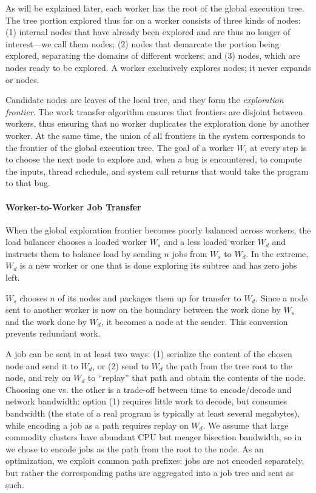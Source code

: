 As will be explained later, each worker has the root of the global execution tree.  The tree portion explored thus far on a worker consists of three kinds of nodes: (1) internal nodes that have already been explored and are thus no longer of interest---we call them {\em \dead} nodes; (2) {\em \fence} nodes that demarcate the portion being explored, separating the domains of different workers; and (3) {\em \candidate} nodes, which are nodes ready to be explored.  A worker exclusively explores \candidate nodes; it never expands \fence or \dead nodes.

Candidate nodes are leaves of the local tree, and they form the \emph{exploration frontier}.  The work transfer algorithm ensures that frontiers are disjoint between workers, thus ensuring that no worker duplicates the exploration done by another worker.  At the same time, the union of all frontiers in the system corresponds to the frontier of the global execution tree. The goal of a worker  $W_i$ at every step is to choose the next \candidate node to explore and, when a bug is encountered, to compute the inputs, thread schedule, and system call returns that would take the program to that bug.

\paragraph{Worker-to-Worker Job Transfer}
\label{sec:workTransfer}

\newcommand{\wsrc}{\ensuremath{W_s}\xspace}
\newcommand{\wdst}{\ensuremath{W_d}\xspace}

When the global exploration frontier becomes poorly balanced across workers, the load balancer chooses a loaded worker \wsrc and a less loaded worker \wdst  and instructs them to balance load by sending $n$ jobs from \wsrc to \wdst.  In the extreme, \wdst is a new worker or one that is done exploring its subtree and has zero jobs left.  

\wsrc chooses $n$ of its \candidate nodes and packages them up for transfer to \wdst.  Since a \candidate node sent to another worker is now on the boundary between the work done by \wsrc and the work done by \wdst, it becomes a \fence node at the sender.  This conversion prevents redundant work.

A job can be sent in at least two ways: (1) serialize the content of the chosen node and send it to \wdst, or (2) send to \wdst the path from the tree root to the node, and rely on \wdst to ``replay'' that path and obtain the contents of the node.  Choosing one vs. the other is a trade-off between time to encode/decode and network bandwidth: option (1) requires little work to decode, but consumes bandwidth (the state of a real program is typically at least several megabytes), while encoding a job as a path requires replay on \wdst.  We assume that large commodity clusters have abundant CPU but meager bisection bandwidth,
so in \cnine we chose to encode jobs as the path from the root to the \candidate node.  As an optimization, we exploit common path prefixes: jobs are not encoded separately, but rather the corresponding paths are aggregated into a job tree and sent as such.

